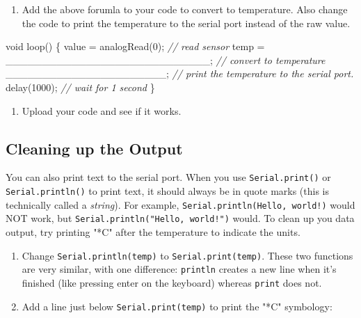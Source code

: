 \documentclass[]{book}
\newenvironment{Shaded}{\begin{snugshade}}{\end{snugshade}}
\newcommand{\CommentTok}[1]{\textcolor[rgb]{0.56,0.35,0.01}{\textit{#1}}}
\newcommand{\DataTypeTok}[1]{\textcolor[rgb]{0.13,0.29,0.53}{#1}}
\newcommand{\DecValTok}[1]{\textcolor[rgb]{0.00,0.00,0.81}{#1}}
\newcommand{\NormalTok}[1]{#1}
\providecommand{\tightlist}{%
  \setlength{\itemsep}{0pt}\setlength{\parskip}{0pt}}
\begin{document}
\begin{enumerate}
\def\labelenumi{\arabic{enumi}.}
\tightlist
\item
  Add the above forumla to your code to convert to temperature. Also change the code to print the temperature to the serial port instead of the raw value.
\end{enumerate}

\begin{Shaded}
\begin{Highlighting}[]
    \DataTypeTok{void}\NormalTok{ loop() \{}
\NormalTok{        value = analogRead(}\DecValTok{0}\NormalTok{); }\CommentTok{// read sensor}
\NormalTok{        temp  = ____________________________; }\CommentTok{// convert to temperature}
\NormalTok{        ______________________; }\CommentTok{// print the temperature to the serial port.}
\NormalTok{        delay(}\DecValTok{1000}\NormalTok{);            }\CommentTok{// wait for 1 second}
\NormalTok{    \}}
\end{Highlighting}
\end{Shaded}

\begin{enumerate}
\def\labelenumi{\arabic{enumi}.}
\tightlist
\item
  Upload your code and see if it works.
\end{enumerate}

\hypertarget{cleaning-up-the-output}{%
\subsection{Cleaning up the Output}\label{cleaning-up-the-output}}

You can also print text to the serial port. When you use \texttt{Serial.print()} or \texttt{Serial.println()} to print text, it should always be in quote marks (this is technically called a \emph{string}). For example, \texttt{Serial.println(Hello,\ world!)} would NOT work, but \texttt{Serial.println("Hello,\ world!")} would. To clean up you data output, try printing "*C" after the temperature to indicate the units.

\begin{enumerate}
\def\labelenumi{\arabic{enumi}.}
\tightlist
\item
  Change \texttt{Serial.println(temp)} to \texttt{Serial.print(temp)}. These two functions are very similar, with one difference: \texttt{println} creates a new line when it's finished (like pressing enter on the keyboard) whereas \texttt{print} does not.
\item
  Add a line just below \texttt{Serial.print(temp)} to print the "*C" symbology:
\end{enumerate}
\end{document}
